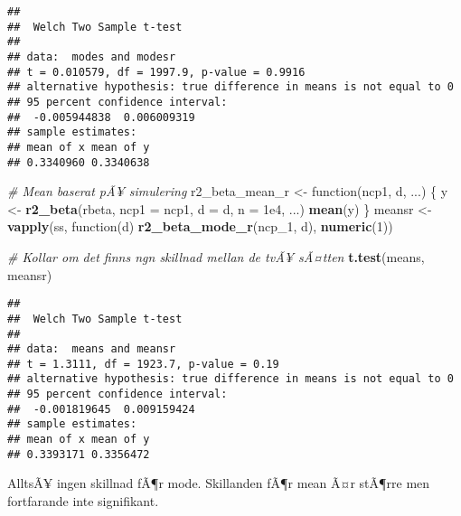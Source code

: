 \documentclass[]{article}
\newenvironment{Shaded}{\begin{snugshade}}{\end{snugshade}}
\newcommand{\KeywordTok}[1]{\textcolor[rgb]{0.13,0.29,0.53}{\textbf{{#1}}}}
\newcommand{\DataTypeTok}[1]{\textcolor[rgb]{0.13,0.29,0.53}{{#1}}}
\newcommand{\DecValTok}[1]{\textcolor[rgb]{0.00,0.00,0.81}{{#1}}}
\newcommand{\FloatTok}[1]{\textcolor[rgb]{0.00,0.00,0.81}{{#1}}}
\newcommand{\StringTok}[1]{\textcolor[rgb]{0.31,0.60,0.02}{{#1}}}
\newcommand{\CommentTok}[1]{\textcolor[rgb]{0.56,0.35,0.01}{\textit{{#1}}}}
\newcommand{\NormalTok}[1]{{#1}}
\begin{document}
\begin{verbatim}
## 
##  Welch Two Sample t-test
## 
## data:  modes and modesr
## t = 0.010579, df = 1997.9, p-value = 0.9916
## alternative hypothesis: true difference in means is not equal to 0
## 95 percent confidence interval:
##  -0.005944838  0.006009319
## sample estimates:
## mean of x mean of y 
## 0.3340960 0.3340638
\end{verbatim}

\begin{Shaded}
\begin{Highlighting}[]
\CommentTok{# Mean baserat pÃ¥ simulering}
\NormalTok{r2_beta_mean_r <-}\StringTok{ }\NormalTok{function(ncp1, d, ...) \{}
  \NormalTok{y <-}\StringTok{ }\KeywordTok{r2_beta}\NormalTok{(rbeta, }\DataTypeTok{ncp1 =} \NormalTok{ncp1, }\DataTypeTok{d =} \NormalTok{d, }\DataTypeTok{n =} \FloatTok{1e4}\NormalTok{, ...)}
  \KeywordTok{mean}\NormalTok{(y)}
\NormalTok{\}}
\NormalTok{meansr <-}\StringTok{ }\KeywordTok{vapply}\NormalTok{(ss, function(d) }\KeywordTok{r2_beta_mode_r}\NormalTok{(ncp_1, d), }\KeywordTok{numeric}\NormalTok{(}\DecValTok{1}\NormalTok{))}

\CommentTok{# Kollar om det finns ngn skillnad mellan de tvÃ¥ sÃ¤tten }
\KeywordTok{t.test}\NormalTok{(means, meansr)}
\end{Highlighting}
\end{Shaded}

\begin{verbatim}
## 
##  Welch Two Sample t-test
## 
## data:  means and meansr
## t = 1.3111, df = 1923.7, p-value = 0.19
## alternative hypothesis: true difference in means is not equal to 0
## 95 percent confidence interval:
##  -0.001819645  0.009159424
## sample estimates:
## mean of x mean of y 
## 0.3393171 0.3356472
\end{verbatim}

AlltsÃ¥ ingen skillnad fÃ¶r mode. Skillanden fÃ¶r mean Ã¤r stÃ¶rre men
fortfarande inte signifikant.
\end{document}

